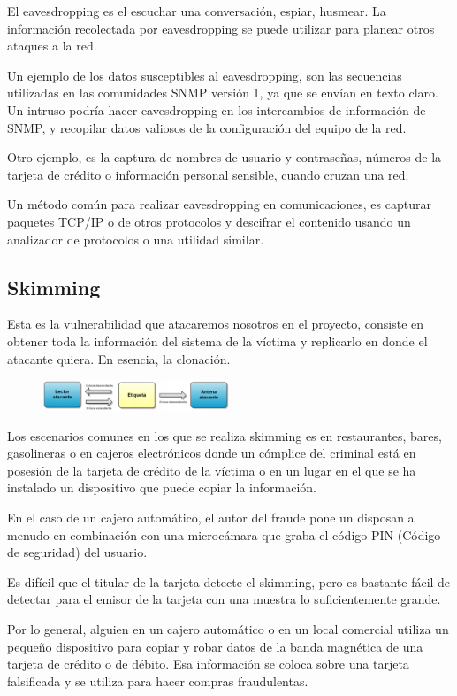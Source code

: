 El eavesdropping es el escuchar una conversación, espiar, husmear. La información recolectada por eavesdropping se puede utilizar para planear otros ataques a la red.

Un ejemplo de los datos susceptibles al eavesdropping, son las secuencias utilizadas en las comunidades SNMP versión 1, ya que se envían en texto claro. Un intruso podría hacer eavesdropping en los intercambios de información de SNMP, y recopilar datos valiosos de la configuración del equipo de la red.

Otro ejemplo, es la captura de nombres de usuario y contraseñas, números de la tarjeta de crédito o información personal sensible, cuando cruzan una red.

Un método común para realizar eavesdropping en comunicaciones, es capturar paquetes TCP/IP o de otros protocolos y descifrar el contenido usando un analizador de protocolos o una utilidad similar.
\subsection{Skimming}
Esta es la vulnerabilidad que atacaremos nosotros en el proyecto, consiste en obtener toda la información del sistema de la víctima y replicarlo en donde el atacante quiera. En esencia, la clonación.\\

\begin{figure}[!h]
	\centering
	\includegraphics[width=0.5\textwidth]{figures/skimming.png}
\end{figure}
Los escenarios comunes en los que se realiza skimming es en restaurantes, bares, gasolineras o en cajeros electrónicos donde un cómplice del criminal está en posesión de la tarjeta de crédito de la víctima o en un lugar en el que se ha instalado un dispositivo que puede copiar la información.

En el caso de un cajero automático, el autor del fraude pone un disposan a menudo en combinación con una microcámara que graba el código PIN (Código de seguridad) del usuario.

Es difícil que el titular de la tarjeta detecte el skimming, pero es bastante fácil de detectar para el emisor de la tarjeta con una muestra lo suficientemente grande.

Por lo general, alguien en un cajero automático o en un local comercial utiliza un pequeño dispositivo para copiar y robar datos de la banda magnética de una tarjeta de crédito o de débito. Esa información se coloca sobre una tarjeta falsificada y se utiliza para hacer compras fraudulentas.
